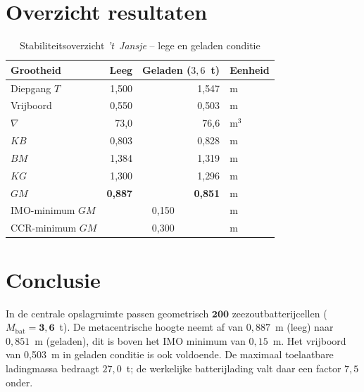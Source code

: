 \section{Overzicht resultaten}
\label{sec:stab_overzicht}

\begin{table}[H]
\centering
\caption{Stabiliteitsoverzicht \emph{'t~Jansje} -- lege en geladen conditie}
\label{tab:stab_overzicht}
\begin{tabular}{lrrl}
\toprule
Grootheid & Leeg & Geladen ($3{,}6$~t) & Eenheid \\
\midrule
Diepgang $T$             & 1{,}500 & 1{,}547 & m     \\
Vrijboord                & 0{,}550 & 0{,}503 & m     \\
$\nabla$                 & 73{,}0  & 76{,}6  & m$^3$ \\
\midrule
$KB$                     & 0{,}803 & 0{,}828 & m \\
$BM$                     & 1{,}384 & 1{,}319 & m \\
$KG$                     & 1{,}300 & 1{,}296 & m \\
\midrule
\rowcolor{green!15}
$GM$                     & \textbf{0{,}887} & \textbf{0{,}851} & m \\
IMO-minimum $GM$         & \multicolumn{2}{c}{0{,}150} & m \\
CCR-minimum $GM$ \cite{CCR2015} & \multicolumn{2}{c}{0{,}300} & m \\
\bottomrule
\end{tabular}
\end{table}


\section*{Conclusie}
\label{sec:stab_conclusie}

In de centrale opslagruimte passen geometrisch $\mathbf{200}$
zeezoutbatterijcellen ($M_\mathrm{bat} = \mathbf{3{,}6}$~t). De
metacentrische hoogte neemt af van $0{,}887$~m (leeg) naar $0{,}851$~m
(geladen), dit is boven het IMO minimum van $0{,}15$~m. Het vrijboord van 0{,}503~m in geladen conditie
is ook voldoende. De maximaal toelaatbare ladingmassa bedraagt
$27{,}0$~t; de werkelijke batterijlading valt daar een factor $7{,}5$
onder.